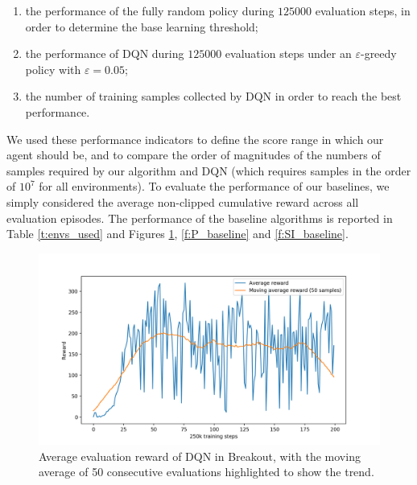 \begin{enumerate}
    \item the performance of the fully random policy during $125000$ evaluation
    steps, in order to determine the base learning threshold;
    \item the performance of DQN during $125000$ evaluation steps under an 
    $\varepsilon$-greedy policy with $\varepsilon = 0.05$;
    \item the number of training samples collected by DQN in order to reach the
    best performance.
\end{enumerate}
We used these performance indicators to define the score range in which our 
agent should be, and to compare the order of magnitudes of the numbers of 
samples required by our algorithm and DQN (which requires samples in the order 
of $10^7$ for all environments). 
To evaluate the performance of our baselines, we simply considered the average 
non-clipped cumulative reward across all evaluation episodes. 
The performance of the baseline algorithms is reported in Table \ref{t:envs_used} 
and Figures \ref{f:BO_baseline}, \ref{f:P_baseline} and \ref{f:SI_baseline}.
%
\begin{figure}
    \includegraphics[width=\textwidth]{pictures/experiments/baseline_breakout}
    \centering
    \caption[Average performance of DQN in Breakout]{Average evaluation reward of 
	    DQN in Breakout, with the moving average of 50 consecutive evaluations 
	    highlighted to show the trend.}
    \label{f:BO_baseline}
\end{figure}
%
%
